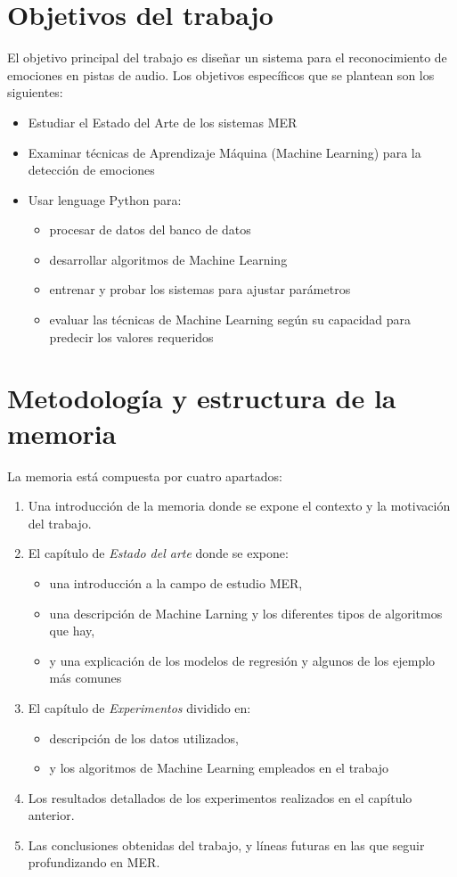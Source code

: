 \documentclass[12pt,a4paper,Spanish]{book}
\begin{document}
\section{Objetivos del trabajo}
El objetivo principal del trabajo es diseñar un sistema para el reconocimiento de emociones en pistas de audio.
Los objetivos específicos que se plantean son los siguientes:
\begin{itemize}
\item Estudiar el Estado del Arte de los sistemas MER
\item Examinar técnicas de Aprendizaje Máquina (Machine Learning) para la detección de emociones
\item Usar lenguage Python para:
 	\begin{itemize}
 		\item procesar de datos del banco de datos 
 		\item desarrollar algoritmos de Machine Learning
 		\item entrenar y probar los sistemas para ajustar parámetros
 		\item evaluar las técnicas de Machine Learning según su capacidad para predecir los valores requeridos 		
 	\end{itemize}
\end{itemize}

\section{Metodología y estructura de la memoria}
La memoria está compuesta por cuatro apartados:
\begin{enumerate}
	\item Una introducción de la memoria donde se expone el contexto y la motivación del trabajo.
	\item El capítulo de \textit{Estado del arte} donde se expone:
	\begin{itemize}
		\item una introducción a la campo de estudio MER,
		\item una descripción de Machine Larning y los diferentes tipos de algoritmos que hay, 
		\item y una explicación de los modelos de regresión y algunos de los ejemplo más comunes
	\end{itemize}
	\item El capítulo de \textit{Experimentos} dividido en:
	\begin{itemize}
		\item descripción de los datos utilizados,
		\item y los algoritmos de Machine Learning empleados en el trabajo
	\end{itemize}
	\item Los resultados detallados de los experimentos realizados en el capítulo anterior.
	\item Las conclusiones obtenidas del trabajo, y líneas futuras en las que seguir profundizando en MER.
\end{enumerate}
\end{document}
